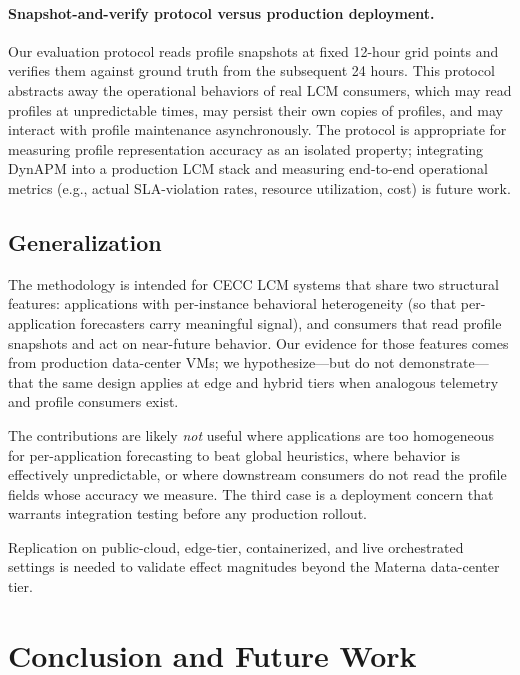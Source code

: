 \documentclass[manuscript,screen,review,anonymous]{acmart}
\begin{document}
\paragraph{Snapshot-and-verify protocol versus production deployment.}
Our evaluation protocol reads profile snapshots at fixed
12-hour grid points and verifies them against ground truth from
the subsequent 24 hours. This protocol abstracts away the
operational behaviors of real LCM consumers, which may read
profiles at unpredictable times, may persist their own copies
of profiles, and may interact with profile maintenance
asynchronously. The protocol is appropriate for measuring profile
representation accuracy as an isolated property; integrating
DynAPM into a production LCM stack and measuring end-to-end
operational metrics (e.g., actual SLA-violation rates, resource
utilization, cost) is future work.

\subsection{Generalization}\label{sec:discussion-generalization}

The methodology is intended for CECC LCM systems that share two
structural features: applications with per-instance behavioral
heterogeneity (so that per-application forecasters carry
meaningful signal), and consumers that read profile snapshots and
act on near-future behavior. Our evidence for those features comes
from production data-center VMs; we hypothesize---but do not
demonstrate---that the same design applies at edge and hybrid
tiers when analogous telemetry and profile consumers exist.

The contributions are likely \emph{not} useful where applications
are too homogeneous for per-application forecasting to beat global
heuristics, where behavior is effectively unpredictable, or where
downstream consumers do not read the profile fields whose accuracy
we measure. The third case is a deployment concern that warrants
integration testing before any production rollout.

Replication on public-cloud, edge-tier, containerized, and live
orchestrated settings is needed to validate effect magnitudes
beyond the Materna data-center tier.

\section{Conclusion and Future Work}\label{sec:conclusion}
\end{document}
